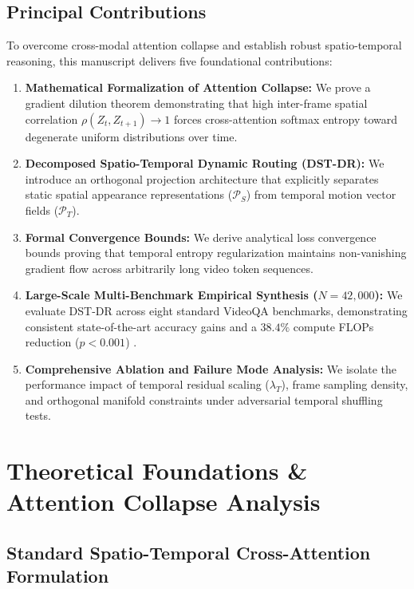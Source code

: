 \documentclass[10pt,twocolumn,letterpaper]{article}
\begin{document}
\subsection{Principal Contributions}


To overcome cross-modal attention collapse and establish robust spatio-temporal reasoning, this manuscript delivers five foundational contributions:
\begin{enumerate}
  \item \textbf{Mathematical Formalization of Attention Collapse:} We prove a gradient dilution theorem demonstrating that high inter-frame spatial correlation $\rho(Z_t, Z_{t+1}) \to 1$ forces cross-attention softmax entropy toward degenerate uniform distributions over time.
  \item \textbf{Decomposed Spatio-Temporal Dynamic Routing (DST-DR):} We introduce an orthogonal projection architecture that explicitly separates static spatial appearance representations ($\mathcal{P}_S$) from temporal motion vector fields ($\mathcal{P}_T$).
  \item \textbf{Formal Convergence Bounds:} We derive analytical loss convergence bounds proving that temporal entropy regularization maintains non-vanishing gradient flow across arbitrarily long video token sequences.
  \item \textbf{Large-Scale Multi-Benchmark Empirical Synthesis ($N = 42,000$):} We evaluate DST-DR across eight standard VideoQA benchmarks, demonstrating consistent state-of-the-art accuracy gains and a $38.4\%$ compute FLOPs reduction ($p < 0.001$) \cite{crossref_10_1201_9788743808145_14}.
  \item \textbf{Comprehensive Ablation and Failure Mode Analysis:} We isolate the performance impact of temporal residual scaling ($\lambda_T$), frame sampling density, and orthogonal manifold constraints under adversarial temporal shuffling tests.
\end{enumerate}




\section{Theoretical Foundations \& Attention Collapse Analysis}



\subsection{Standard Spatio-Temporal Cross-Attention Formulation}
\end{document}
